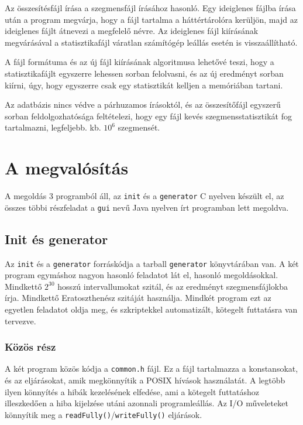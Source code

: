 Az összesítésfájl írása a szegmensfájl írásához hasonló.
Egy ideiglenes fájlba írása után a program megvárja, hogy a fájl tartalma a háttértárolóra kerüljön, majd az ideiglenes fájlt átnevezi a megfelelő névre.
Az ideiglenes fájl kiírásának megvárásával a statisztikafájl váratlan számítógép leállás esetén is visszaállítható.

A fájl formátuma és az új fájl kiírásának algoritmusa lehetővé teszi, hogy a statisztikafájlt egyszerre lehessen sorban felolvasni, és az új eredményt sorban kiírni, úgy, hogy egyszerre csak egy statisztikát kelljen a memóriában tartani.

Az adatbázis nincs védve a párhuzamos írásoktól, és az összesítőfájl egyszerű sorban feldolgozhatósága feltételezi, hogy egy fájl kevés szegmensstatisztikát fog tartalmazni, legfeljebb. kb. $10^6$ szegmensét.

\section{A megvalósítás}

A megoldás 3 programból áll, az \texttt{init} és a \texttt{generator} C nyelven készült el, az összes többi részfeladat a \texttt{gui} nevű Java nyelven írt programban lett megoldva.

\subsection{Init és generator}

Az \texttt{init} és a \texttt{generator} forráskódja a tarball \texttt{generator} könyvtárában van.
A két program egymáshoz nagyon hasonló feladatot lát el, hasonló megoldásokkal.
Mindkettő $2^{30}$ hosszú intervallumokat szitál, és az eredményt szegmensfájlokba írja.
Mindkettő Eratoszthenész szitáját használja.
Mindkét program ezt az egyetlen feladatot oldja meg, és szkriptekkel automatizált, kötegelt futtatásra van tervezve.

\subsubsection{Közös rész}

A két program közös kódja a \texttt{common.h} fájl.
Ez a fájl tartalmazza a konstansokat, és az eljárásokat, amik megkönnyítik a POSIX hívások használatát.
A legtöbb ilyen könnyítés a hibák kezelésének elfedése, ami a kötegelt futtatáshoz illeszkedően
a hiba kijelzése utáni azonnali programleállás.
Az I/O műveleteket könnyítik meg a \texttt{readFully()}/\texttt{writeFully()} eljárások.

